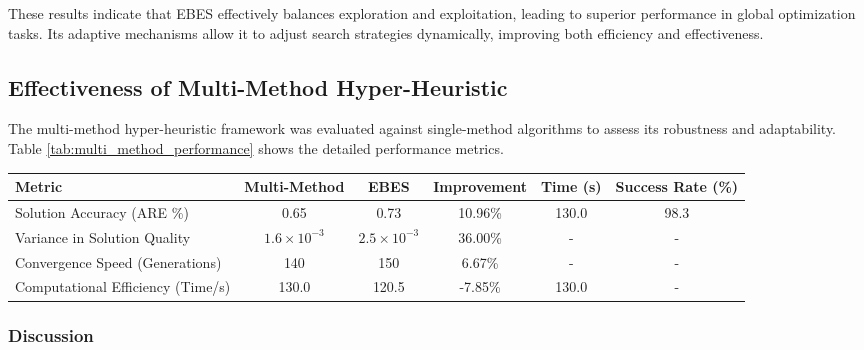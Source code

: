 \documentclass[conference]
{IEEEtran}
\begin{document}
These results indicate that EBES effectively balances exploration and exploitation, leading to superior performance in global optimization tasks. Its adaptive mechanisms allow it to adjust search strategies dynamically, improving both efficiency and effectiveness.

\subsection{Effectiveness of Multi-Method Hyper-Heuristic}

The multi-method hyper-heuristic framework was evaluated against single-method algorithms to assess its robustness and adaptability. Table \ref{tab:multi_method_performance} shows the detailed performance metrics.

\begin{table*}[ht]
\caption{Multi-Method Hyper-Heuristic Detailed Performance}
\label{tab:multi_method_performance}
\centering
\small %
\begin{tabular}{p{3.2cm}ccccc}
\toprule
\textbf{Metric} & \textbf{Multi-Method} & \textbf{EBES} & \textbf{Improvement} & \textbf{Time (s)} & \textbf{Success Rate (\%)} \\
\midrule
Solution Accuracy (ARE \%) & 0.65 & 0.73 & 10.96\% & 130.0 & 98.3 \\
Variance in Solution Quality & $1.6 \times 10^{-3}$ & $2.5 \times 10^{-3}$ & 36.00\% & - & - \\
Convergence Speed (Generations) & 140 & 150 & 6.67\% & - & - \\
Computational Efficiency (Time/s) & 130.0 & 120.5 & -7.85\% & 130.0 & - \\
\bottomrule
\end{tabular}
\end{table*}


\subsubsection{Discussion}
\end{document}

